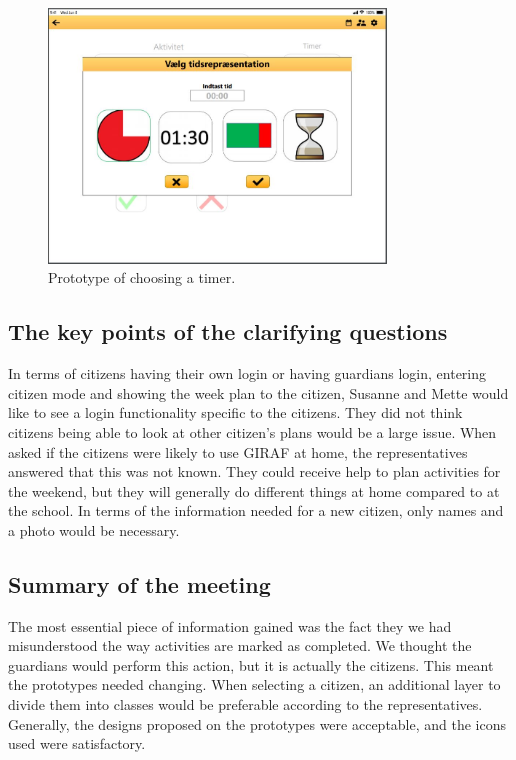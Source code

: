 \begin{figure}[h!]
  \center
  \includegraphics[width=0.8\textwidth]{figures/select-timer-prototype.JPG}
  \caption{\label{fig:choose-citizen-prototype} Prototype of choosing a timer.}
\end{figure}

\subsection{The key points of the clarifying questions}
In terms of citizens having their own login or having guardians login, entering citizen mode and showing the week plan to the citizen, Susanne and Mette would like to see a login functionality specific to the citizens.
They did not think citizens being able to look at other citizen's plans would be a large issue.
When asked if the citizens were likely to use GIRAF at home, the representatives answered that this was not known.
They could receive help to plan activities for the weekend, but they will generally do different things at home compared to at the school.
In terms of the information needed for a new citizen, only names and a photo would be necessary.

\subsection{Summary of the meeting}
The most essential piece of information gained was the fact they we had misunderstood the way activities are marked as completed.
We thought the guardians would perform this action, but it is actually the citizens.
This meant the prototypes needed changing.
When selecting a citizen, an additional layer to divide them into classes would be preferable according to the representatives.
Generally, the designs proposed on the prototypes were acceptable, and the icons used were satisfactory.
